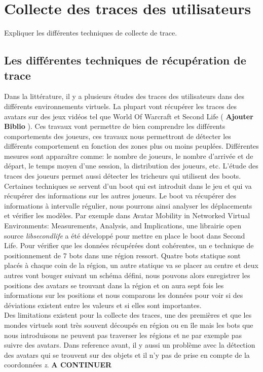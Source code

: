 \section{Collecte des traces des utilisateurs}
	\label{trace}
	Expliquer les différentes techniques de collecte de trace.
	\subsection{Les différentes techniques de récupération de trace}
	Dans la littérature, il y a plusieurs études des traces des utilisateurs dans des différents environnements virtuels. La plupart vont récupérer les traces des avatars sur des jeux vidéos tel que World Of Warcraft et Second Life ( \textbf{Ajouter Biblio} ). Ces travaux vont permettre de bien comprendre les différents comportements des joueurs, ces travaux nous permettront de détecter les différents comportement en fonction des zones plus ou moins peuplées. Différentes mesures sont apparaître comme: le nombre de joueurs, le nombre d'arrivée et de départ, le temps moyen d'une session, la distribution des joueurs, etc. L'étude des traces des joueurs permet aussi détecter les tricheurs qui utilisent des boots. \\
	
	Certaines techniques se servent d'un boot qui est introduit dans le jeu et qui va récupérer des informations sur les autres joueurs. Le boot va récupérer des informations à intervalle régulier, nous pourrons ainsi analyser les déplacements et vérifier les modèles. Par exemple dans {Avatar Mobility in Networked Virtual Environments: Measurements, Analysis, and Implications}, une librairie open source \textit{libsecondlife} a été développé pour mettre en place le boot dans Second Life. Pour vérifier que les données récupérées dont cohérentes, un e technique de positionnement de 7 bots dans une région ressort. Quatre bots statique sont placés à chaque coin de la région, un autre statique va se placer au centre et deux autres vont bouger suivant un schéma défini, nous pouvons alors enregistrer les positions des avatars se trouvant dans la région et on aura sept fois les informations sur les positions et nous comparons les données pour voir si des déviations existent entre les valeurs et si elles sont importantes.\\  
 	
	Des limitations existent pour la collecte des traces, une des premières et que les mondes virtuels sont très souvent découpés en région ou en île mais les bots que nous introduisons ne peuvent pas traverser les régions et ne par exemple pas suivre des avatars. Dans { reference avant}, il y aussi un problème avec la détection des avatars qui se trouvent sur des objets et il n'y pas de prise en compte de la coordonnées \textit{z}. \textbf{A CONTINUER}	

